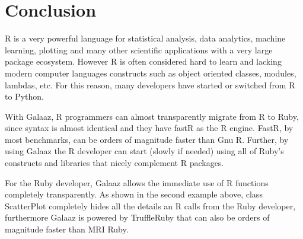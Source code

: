 \documentclass[11pt,]{article}
\begin{document}
\section{Conclusion}\label{conclusion}

R is a very powerful language for statistical analysis, data analytics,
machine learning, plotting and many other scientific applications with a
very large package ecosystem. However R is often considered hard to
learn and lacking modern computer languages constructs such as object
oriented classes, modules, lambdas, etc. For this reason, many
developers have started or switched from R to Python.

With Galaaz, R programmers can almost transparently migrate from R to
Ruby, since syntax is almost identical and they have fastR as the R
engine. FastR, by most benchmarks, can be orders of magnitude faster
than Gnu R. Further, by using Galaaz the R developer can start (slowly
if needed) using all of Ruby's constructs and libraries that nicely
complement R packages.

For the Ruby developer, Galaaz allows the immediate use of R functions
completely transparently. As shown in the second example above, class
ScatterPlot completely hides all the details an R calls from the Ruby
developer, furthermore Galaaz is powered by TruffleRuby that can also be
orders of magnitude faster than MRI Ruby.
\end{document}
